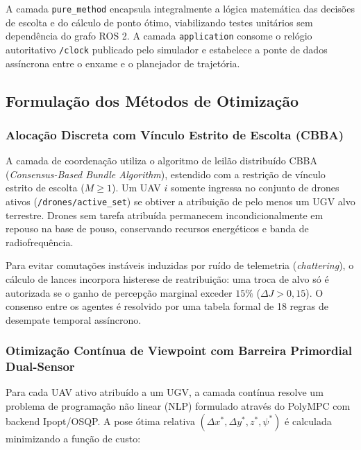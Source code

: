 \documentclass[
  brazilian,
  a4paper]{article}
\begin{document}
A camada \texttt{pure\_\allowbreak{}method} encapsula integralmente a lógica
matemática das decisões de escolta e do cálculo de ponto ótimo,
viabilizando testes unitários sem dependência do grafo ROS 2. A camada
\texttt{application} consome o relógio autoritativo \texttt{/\allowbreak{}clock}
publicado pelo simulador e estabelece a ponte de dados assíncrona entre
o enxame e o planejador de trajetória.

\subsection{Formulação dos Métodos de
Otimização}\label{formulauxe7uxe3o-dos-muxe9todos-de-otimizauxe7uxe3o}

\subsubsection{Alocação Discreta com Vínculo Estrito de Escolta
(CBBA)}\label{alocauxe7uxe3o-discreta-com-vuxednculo-estrito-de-escolta-cbba}

A camada de coordenação utiliza o algoritmo de leilão distribuído CBBA
(\emph{Consensus-Based Bundle Algorithm}), estendido com a restrição de
vínculo estrito de escolta (\(M \ge 1\)). Um UAV \(i\) somente ingressa
no conjunto de drones ativos (\texttt{/\allowbreak{}drones/\allowbreak{}active\_\allowbreak{}set}) se obtiver a
atribuição de pelo menos um UGV alvo terrestre. Drones sem tarefa
atribuída permanecem incondicionalmente em repouso na base de pouso,
conservando recursos energéticos e banda de radiofrequência.

Para evitar comutações instáveis induzidas por ruído de telemetria
(\emph{chattering}), o cálculo de lances incorpora histerese de
reatribuição: uma troca de alvo só é autorizada se o ganho de percepção
marginal exceder \(15\%\) (\(\Delta J > 0{,}15\)). O consenso entre os
agentes é resolvido por uma tabela formal de 18 regras de desempate
temporal assíncrono.

\subsubsection{Otimização Contínua de Viewpoint com Barreira Primordial
Dual-Sensor}\label{otimizauxe7uxe3o-contuxednua-de-viewpoint-com-barreira-primordial-dual-sensor}

Para cada UAV ativo atribuído a um UGV, a camada contínua resolve um
problema de programação não linear (NLP) formulado através do PolyMPC
com backend Ipopt/OSQP. A pose ótima relativa
\((\Delta x^*, \Delta y^*, z^*, \psi^*)\) é calculada minimizando a
função de custo:
\end{document}
